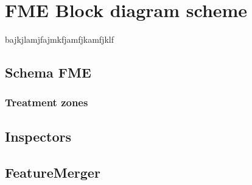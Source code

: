 \chapter[FME Block diagram scheme]{FME Block diagram scheme}
\label{sec:FME_Block}

\begin{Resumen}

bajkjlamjfajmkfjamfjkamfjklf
\end{Resumen}

\PartialToc

\section{Schema FME}
\subsection{Treatment zones}
\section{Inspectors}
\section{FeatureMerger}
